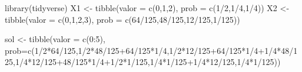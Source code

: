 \documentclass[
]{article}
\newenvironment{Shaded}{\begin{snugshade}}{\end{snugshade}}
\newcommand{\AttributeTok}[1]{\textcolor[rgb]{0.77,0.63,0.00}{#1}}
\newcommand{\DecValTok}[1]{\textcolor[rgb]{0.00,0.00,0.81}{#1}}
\newcommand{\FunctionTok}[1]{\textcolor[rgb]{0.00,0.00,0.00}{#1}}
\newcommand{\NormalTok}[1]{#1}
\newcommand{\OtherTok}[1]{\textcolor[rgb]{0.56,0.35,0.01}{#1}}
\newcommand{\SpecialCharTok}[1]{\textcolor[rgb]{0.00,0.00,0.00}{#1}}
\begin{document}
\begin{Shaded}
\begin{Highlighting}[]
\FunctionTok{library}\NormalTok{(tidyverse)}
\NormalTok{X1 }\OtherTok{\textless{}{-}} \FunctionTok{tibble}\NormalTok{(}\AttributeTok{valor =} \FunctionTok{c}\NormalTok{(}\DecValTok{0}\NormalTok{,}\DecValTok{1}\NormalTok{,}\DecValTok{2}\NormalTok{), }\AttributeTok{prob =} \FunctionTok{c}\NormalTok{(}\DecValTok{1}\SpecialCharTok{/}\DecValTok{2}\NormalTok{,}\DecValTok{1}\SpecialCharTok{/}\DecValTok{4}\NormalTok{,}\DecValTok{1}\SpecialCharTok{/}\DecValTok{4}\NormalTok{))}
\NormalTok{X2 }\OtherTok{\textless{}{-}} \FunctionTok{tibble}\NormalTok{(}\AttributeTok{valor =} \FunctionTok{c}\NormalTok{(}\DecValTok{0}\NormalTok{,}\DecValTok{1}\NormalTok{,}\DecValTok{2}\NormalTok{,}\DecValTok{3}\NormalTok{), }\AttributeTok{prob =} \FunctionTok{c}\NormalTok{(}\DecValTok{64}\SpecialCharTok{/}\DecValTok{125}\NormalTok{,}\DecValTok{48}\SpecialCharTok{/}\DecValTok{125}\NormalTok{,}\DecValTok{12}\SpecialCharTok{/}\DecValTok{125}\NormalTok{,}\DecValTok{1}\SpecialCharTok{/}\DecValTok{125}\NormalTok{))}

\NormalTok{sol }\OtherTok{\textless{}{-}} \FunctionTok{tibble}\NormalTok{(}\AttributeTok{valor =} \FunctionTok{c}\NormalTok{(}\DecValTok{0}\SpecialCharTok{:}\DecValTok{5}\NormalTok{), }\AttributeTok{prob=}\FunctionTok{c}\NormalTok{(}\DecValTok{1}\SpecialCharTok{/}\DecValTok{2}\SpecialCharTok{*}\DecValTok{64}\SpecialCharTok{/}\DecValTok{125}\NormalTok{,}\DecValTok{1}\SpecialCharTok{/}\DecValTok{2}\SpecialCharTok{*}\DecValTok{48}\SpecialCharTok{/}\DecValTok{125}\SpecialCharTok{+}\DecValTok{64}\SpecialCharTok{/}\DecValTok{125}\SpecialCharTok{*}\DecValTok{1}\SpecialCharTok{/}\DecValTok{4}\NormalTok{,}\DecValTok{1}\SpecialCharTok{/}\DecValTok{2}\SpecialCharTok{*}\DecValTok{12}\SpecialCharTok{/}\DecValTok{125}\SpecialCharTok{+}\DecValTok{64}\SpecialCharTok{/}\DecValTok{125}\SpecialCharTok{*}\DecValTok{1}\SpecialCharTok{/}\DecValTok{4}\SpecialCharTok{+}\DecValTok{1}\SpecialCharTok{/}\DecValTok{4}\SpecialCharTok{*}\DecValTok{48}\SpecialCharTok{/}\DecValTok{125}\NormalTok{,}\DecValTok{1}\SpecialCharTok{/}\DecValTok{4}\SpecialCharTok{*}\DecValTok{12}\SpecialCharTok{/}\DecValTok{125}\SpecialCharTok{+}\DecValTok{48}\SpecialCharTok{/}\DecValTok{125}\SpecialCharTok{*}\DecValTok{1}\SpecialCharTok{/}\DecValTok{4}\SpecialCharTok{+}\DecValTok{1}\SpecialCharTok{/}\DecValTok{2}\SpecialCharTok{*}\DecValTok{1}\SpecialCharTok{/}\DecValTok{125}\NormalTok{,}\DecValTok{1}\SpecialCharTok{/}\DecValTok{4}\SpecialCharTok{*}\DecValTok{1}\SpecialCharTok{/}\DecValTok{125}\SpecialCharTok{+}\DecValTok{1}\SpecialCharTok{/}\DecValTok{4}\SpecialCharTok{*}\DecValTok{12}\SpecialCharTok{/}\DecValTok{125}\NormalTok{,}\DecValTok{1}\SpecialCharTok{/}\DecValTok{4}\SpecialCharTok{*}\DecValTok{1}\SpecialCharTok{/}\DecValTok{125}\NormalTok{))}
\end{Highlighting}
\end{Shaded}
\end{document}
